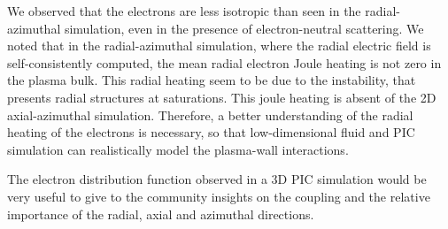 \vspace{1em}
We observed that the electrons are less isotropic than seen in the radial-azimuthal simulation, even in the presence of electron-neutral scattering.
We noted that in the radial-azimuthal simulation, where the radial electric field is self-consistently computed, the mean radial electron Joule heating is not zero in the plasma bulk.
This radial heating seem to be due to the instability, that presents radial structures at saturations.
This joule heating is absent of the \ac{2D} axial-azimuthal simulation.
Therefore, a better understanding of the radial heating of the electrons is necessary, so that low-dimensional fluid and \ac{PIC} simulation can realistically model the plasma-wall interactions.

The electron distribution function observed in a \ac{3D} \ac{PIC} simulation would be very useful to give to the community insights on the coupling and the relative importance of the radial, axial and azimuthal directions.

